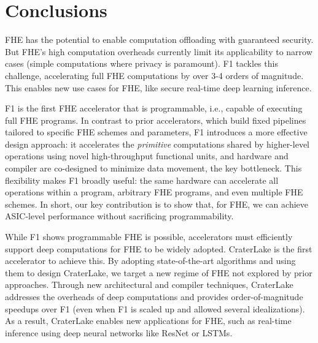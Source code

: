 \chapter{Conclusions}\label{sec:conclusion}

FHE has the potential to enable computation offloading with guaranteed
security. But FHE's high computation overheads currently limit its
applicability to narrow cases (simple computations where privacy is paramount).
F1 tackles this challenge, accelerating full FHE computations by over 3-4
orders of magnitude. This enables new use cases for FHE, like secure real-time
deep learning inference.

F1 is the first FHE accelerator that is programmable, i.e., capable of
executing full FHE programs. In contrast to prior accelerators, which build
fixed pipelines tailored to specific FHE schemes and parameters, F1 introduces
a more effective design approach: it accelerates the \emph{primitive}
computations shared by higher-level operations using novel high\hyp{}throughput
functional units, and hardware and compiler are co-designed to minimize data
movement, the key bottleneck. This flexibility makes F1 broadly useful: the
same hardware can accelerate all operations within a program, arbitrary FHE
programs, and even multiple FHE schemes. In short, our key contribution is to
show that, for FHE, we can achieve ASIC-level performance without sacrificing
programmability.

While F1 shows programmable FHE is possible, accelerators must efficiently
support deep computations for FHE to be widely adopted. CraterLake is the first
accelerator to achieve this. By adopting state-of-the-art algorithms and using
them to design CraterLake, we target a new regime of FHE not explored by prior
approaches. Through new architectural and compiler techniques, CraterLake
addresses the overheads of deep computations and provides order-of-magnitude
speedups over F1 (even when F1 is scaled up and allowed several idealizations).
As a result, CraterLake enables new applications for FHE, such as real-time
inference using deep neural networks like ResNet or LSTMs.

